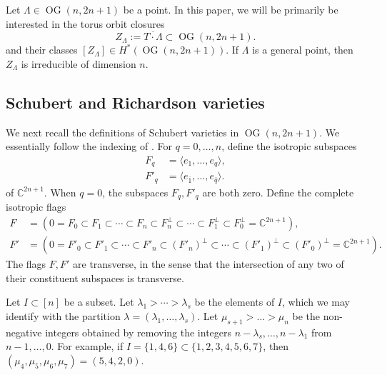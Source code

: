 \documentclass[12pt]{amsart}
\DeclareMathOperator{\OG}{OG}
\newcommand{\bC}{\mathbb{C}}
\newcommand{\barone}{\overline{1}}
\newcommand{\barq}{\overline{q}}
\begin{document}
Let $\Lambda\in\OG(n,2n+1)$ be a point. In this paper, we will be primarily be interested in the torus orbit closures
\begin{equation*}
    Z_\Lambda:=\overline {T\cdot\Lambda}\subset\OG(n,2n+1).
\end{equation*}
and their classes $[Z_\Lambda]\in H^{*}(\OG(n,2n+1))$. If $\Lambda$ is a general point, then $Z_\Lambda$ is irreducible of dimension $n$.

\subsection{Schubert and Richardson varieties}\label{sec:schubert}

We next recall the definitions of Schubert varieties in $\OG(n,2n+1)$. We essentially follow the indexing of \cite{coskun_rigid}. For $q=0,\ldots,n$, define the isotropic subspaces
\begin{align*}
    F_q&=\langle e_1,\ldots,e_q\rangle,\\
    F'_q&=\langle e_{\barone},\ldots,e_{\barq}\rangle.
\end{align*}
of $\bC^{2n+1}$. When $q=0$, the subspaces $F_q,F'_q$ are both zero. Define the complete isotropic flags
\begin{align*}
    F&=(0=F_0\subset F_1\subset\cdots\subset F_n\subset F_n^\perp\subset\cdots\subset F_1^\perp\subset F_0^\perp=\bC^{2n+1}),\\
    F'&=(0=F'_0\subset F'_1\subset\cdots\subset F'_n\subset (F'_n)^\perp\subset\cdots\subset (F'_1)^\perp\subset (F'_0)^\perp=\bC^{2n+1}).
\end{align*}
The flags $F,F'$ are transverse, in the sense that the intersection of any two of their constituent subspaces is transverse.

Let $I\subset[n]$ be a subset. Let $\lambda_1>\cdots>\lambda_s$ be the elements of $I$, which we may identify with the partition $\lambda=(\lambda_1,\ldots,\lambda_s)$. Let $\mu_{s+1}>\ldots>\mu_{n}$ be the non-negative integers obtained by removing the integers $n-\lambda_s,\ldots,n-\lambda_1$ from $n-1,\ldots,0$. For example, if $I=\{1,4,6\}\subset\{1,2,3,4,5,6,7\}$, then $(\mu_4,\mu_5,\mu_6,\mu_7)=(5,4,2,0)$.
\end{document}
